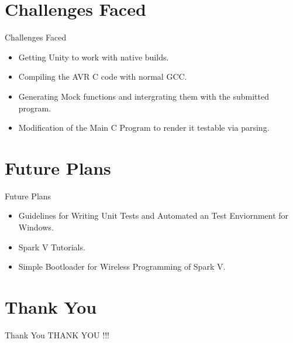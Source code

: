 \documentclass[10pt, a4paper]{beamer}
\begin{document}
\section{Challenges Faced}
\begin{frame}{Challenges Faced}
	\begin{itemize}
		\item Getting Unity to work with native builds.
		\item Compiling the AVR C code with normal GCC.
		\item Generating Mock functions and intergrating them with the submitted program.
		\item Modification of the Main C Program to render it testable via parsing.
	\end{itemize}
\end{frame}

\section{Future Plans}
\begin{frame}{Future Plans}
	\begin{itemize}
		\item Guidelines for Writing Unit Tests and Automated an Test Enviornment for Windows.
		\item Spark V Tutorials.
		\item Simple Bootloader for Wireless Programming of Spark V. 
	\end{itemize}
\end{frame}


\section{Thank You}
\begin{frame}{Thank You}
	\centering THANK YOU !!!
\end{frame}
\end{document}
